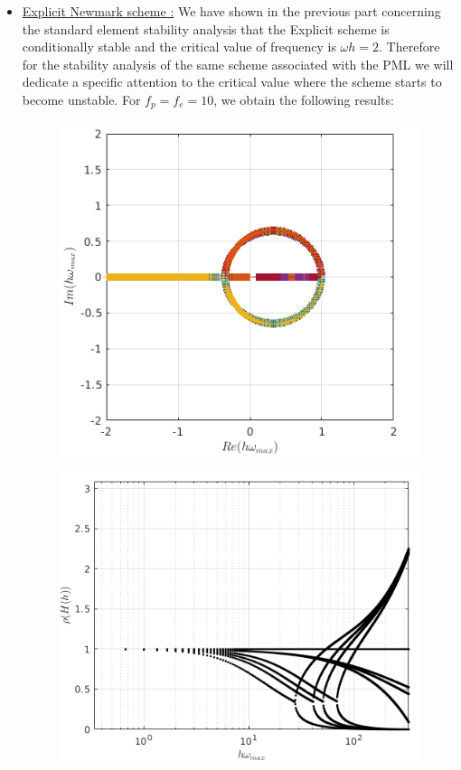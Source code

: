 \begin{itemize}
\item \underline{Explicit Newmark scheme :}
We have shown in the previous part concerning the standard element stability analysis that the Explicit scheme is conditionally stable and the critical value of frequency is $\omega h = 2$. Therefore for the stability analysis of the same scheme associated with the PML we will dedicate a specific attention to the critical value where the scheme starts to become unstable. 
For $f_p = f_e = 10$, we obtain the following results:
\begin{figure}[H]
\centering
\begin{minipage}{.5\textwidth}
  \centering
  \includegraphics[width=.99\linewidth]{images/eig_pml_exp_10.png}
  \label{fig:eig_pml_exp_10}
\end{minipage}%
\begin{minipage}{.5\textwidth}
  \centering
  \includegraphics[width=.99\linewidth]{images/spect_rad_pml_exp_10.png}

\end{minipage}
\end{figure}
\end{itemize}

